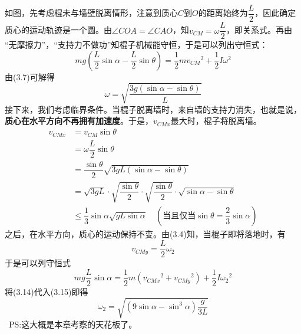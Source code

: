 \begin{solution}
如图，先考虑棍未与墙壁脱离情形，注意到质心$C$到$O$的距离始终为$\dfrac{L}{2}$，因此确定质心的运动轨迹是一个圆。由$\angle COA=\angle CAO$，知$v_{CM}=\omega\dfrac{L}{2}$，即关系式。再由\\[1ex]“无摩擦力”，“支持力不做功”知棍子机械能守恒，于是可以列出守恒式：
		\begin{equation}
			mg(\dfrac{L}{2}\sin\alpha-\dfrac{L}{2}\sin\theta)=\dfrac{1}{2}mv_{CM}{}^2+\dfrac{1}{2}I\omega^2
		\end{equation}
由(3.7)可解得
\begin{equation}
	\omega=\sqrt{\dfrac{3g(\sin\alpha-\sin\theta)}{L}}
\end{equation}
接下来，我们考虑临界条件。当棍子脱离墙时，来自墙的支持力消失，也就是说，\textbf{质心在水平方向不再拥有加速度}。于是，$v_{CMx}$最大时，棍子将脱离墙。
\begin{align}
	v_{CMx}&=v_{CM}\sin\theta\\
	&=\omega\dfrac{L}{2}\sin\theta\\
	&=\dfrac{\sin\theta}{2}\sqrt{3gL(\sin\alpha-\sin\theta)}\\
	&=\sqrt{3gL}\cdot\sqrt{\dfrac{\sin\theta}{2}}\cdot\sqrt{\dfrac{\sin\theta}{2}}\cdot\sqrt{\sin\alpha-\sin\theta}\\
	&\le\dfrac{1}{3}\sin\alpha\sqrt{gL\sin\alpha}\quad(\text{当且仅当}\sin\theta=\dfrac{2}{3}\sin\alpha)
\end{align}
之后，在水平方向，质心的运动保持不变。由(3.4)知，当棍子即将落地时，有\begin{equation}
	v_{CMy}=\dfrac{L}{2}\omega_2
\end{equation}于是可以列守恒式
\begin{equation}
	mg\dfrac{L}{2}\sin\alpha=\dfrac{1}{2}m(v_{CMx}{}^2+v_{CMy}{}^2)+\dfrac{1}{2}I\omega_2{}^2
\end{equation}
将(3.14)代入(3.15)即得
\begin{equation}
	\omega_2=\sqrt{(9\sin\alpha-\sin^3\alpha)\dfrac{g}{3L}}
\end{equation}
\dove\ PS:这大概是本章考察的天花板了。
\end{solution}
